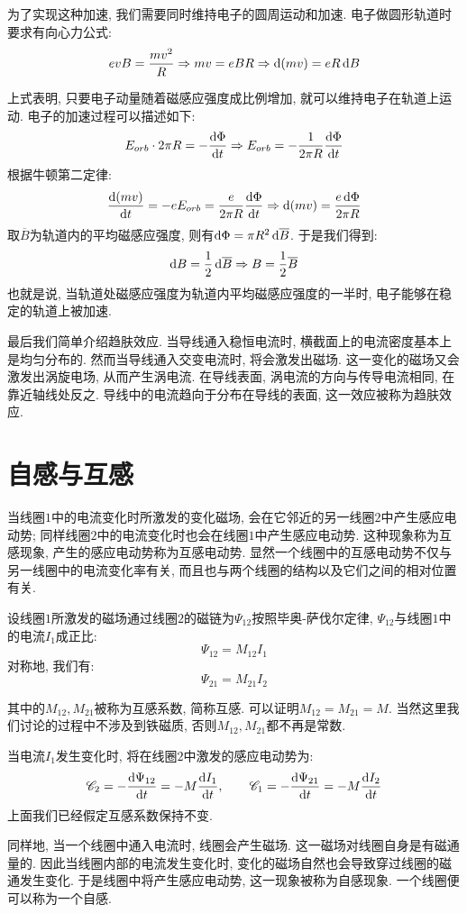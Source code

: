 为了实现这种加速, 我们需要同时维持电子的圆周运动和加速. 电子做圆形轨道时要求有向心力公式:
\[
evB = \frac{mv^2}{R} \Rightarrow mv = eBR \Rightarrow \mathop{}\!\mathrm{d}(mv) = eR\mathop{}\!\mathrm{d} B
\]

上式表明, 只要电子动量随着磁感应强度成比例增加, 就可以维持电子在轨道上运动. 电子的加速过程可以描述如下:
\[
E_{orb} \cdot 2\pi R = -\frac{\mathop{}\!\mathrm{d} \Phi}{\mathop{}\!\mathrm{d} t} \Rightarrow
E_{orb} = -\frac{1}{2\pi R}\frac{\mathop{}\!\mathrm{d} \Phi}{\mathop{}\!\mathrm{d} t}
\]
根据牛顿第二定律:
\[
\frac{\mathop{}\!\mathrm{d} (mv)}{\mathop{}\!\mathrm{d} t}=-eE_{orb}=\frac{e}{2\pi R}\frac{\mathop{}\!\mathrm{d} \Phi}{\mathop{}\!\mathrm{d} t} \Rightarrow \mathop{}\!\mathrm{d}(mv)  =\frac{e \mathop{}\!\mathrm{d} \Phi}{2\pi R}
\]
取$\overline{B}$为轨道内的平均磁感应强度, 则有$\mathop{}\!\mathrm{d} \Phi = \pi R^2\mathop{}\!\mathrm{d} \overline{B}$. 于是我们得到:
\[
\mathop{}\!\mathrm{d} B = \frac{1}{2}\mathop{}\!\mathrm{d} \overline{B} \Rightarrow B = \frac{1}{2}\overline{B}
\]
也就是说, 当轨道处磁感应强度为轨道内平均磁感应强度的一半时, 电子能够在稳定的轨道上被加速.

最后我们简单介绍趋肤效应. 当导线通入稳恒电流时, 横截面上的电流密度基本上是均匀分布的. 然而当导线通入交变电流时, 将会激发出磁场. 这一变化的磁场又会激发出涡旋电场, 从而产生涡电流. 在导线表面, 涡电流的方向与传导电流相同, 在靠近轴线处反之. 导线中的电流趋向于分布在导线的表面, 这一效应被称为趋肤效应.

\section{自感与互感}
当线圈$1$中的电流变化时所激发的变化磁场, 会在它邻近的另一线圈$2$中产生感应电动势; 同样线圈$2$中的电流变化时也会在线圈$1$中产生感应电动势. 这种现象称为互感现象, 产生的感应电动势称为互感电动势. 显然一个线圈中的互感电动势不仅与另一线圈中的电流变化率有关, 而且也与两个线圈的结构以及它们之间的相对位置有关.

设线圈$1$所激发的磁场通过线圈$2$的磁链为$\Psi_{12}$按照毕奥-萨伐尔定律, $\Psi_{12}$与线圈$1$中的电流$I_1$成正比:
\[
\Psi_{12} = M_{12} I_1
\]
对称地, 我们有:
\[
\Psi_{21} = M_{21} I_2
\]

其中的$M_{12},M_{21}$被称为互感系数, 简称互感. 可以证明$M_{12}=M_{21}=M$. 当然这里我们讨论的过程中不涉及到铁磁质, 否则$M_{12},M_{21}$都不再是常数.

当电流$I_1$发生变化时, 将在线圈$2$中激发的感应电动势为:
\[
\mathscr C_2 = -\frac{\d \Psi_{12}}{\d t} = -M\frac{\d I_1}{\d t},\qquad \mathscr C_1 = -\frac{\d \Psi_{21}}{\d t} = -M\frac{\d I_2}{\d t}
\]
上面我们已经假定互感系数保持不变.

同样地, 当一个线圈中通入电流时, 线圈会产生磁场. 这一磁场对线圈自身是有磁通量的. 因此当线圈内部的电流发生变化时, 变化的磁场自然也会导致穿过线圈的磁通发生变化. 于是线圈中将产生感应电动势, 这一现象被称为自感现象. 一个线圈便可以称为一个自感.

